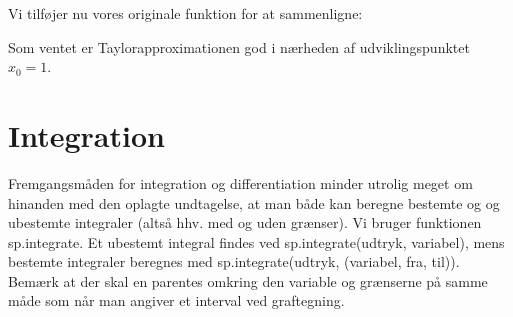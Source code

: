 \documentclass[letterpaper,10pt,english]{jupyterBook}
\begin{document}
\noindent{}

Vi tilføjer nu vores originale funktion for at sammenligne:

\begin{sphinxVerbatim}[commandchars=\\\{\}]
            

\PYG{p}{[}\PYG{p}{]}

   

\end{sphinxVerbatim}

\noindent{}

Som ventet er Taylorapproximationen god i nærheden af udviklingspunktet \(x_0 = 1\).


\section{Integration}
\label{\detokenize{notebooks/sympy/Notebook4:integration}}
Fremgangsmåden for integration og differentiation minder utrolig meget om hinanden med den oplagte undtagelse, at man både kan beregne bestemte og og ubestemte integraler (altså hhv. med og uden grænser). Vi bruger funktionen sp.integrate. Et ubestemt integral findes ved sp.integrate(udtryk, variabel), mens bestemte integraler beregnes med sp.integrate(udtryk, (variabel, fra, til)). Bemærk at der skal en parentes omkring den variable og grænserne på samme måde som når man angiver et interval ved graftegning.
\end{document}
